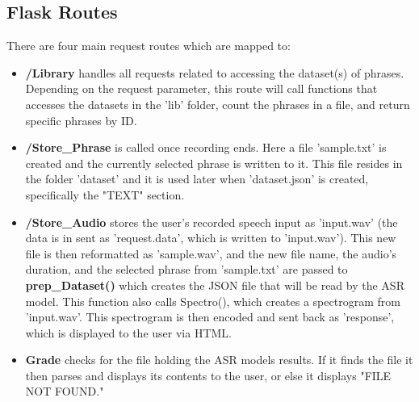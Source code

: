 \documentclass[12pt, letterpaper]{article}
\begin{document}
\subsection*{Flask Routes}
There are four main request routes which are mapped to:
\begin{itemize}
\item{\textbf{/Library}} handles all requests related to accessing the dataset(s) of phrases. Depending on the request parameter, this route will call functions that accesses the datasets in the 'lib' folder, count the phrases in a file, and return specific phrases by ID. 

\item{\textbf{/Store\_Phrase}} is called once recording ends. Here a file 'sample.txt' is created and the currently selected phrase is written to it. This file resides in the folder 'dataset' and it is used later when 'dataset.json' is created, specifically the "TEXT" section.

\item{\textbf{/Store\_Audio}} stores the user's recorded speech input as 'input.wav' (the data is in sent as 'request.data', which is written to 'input.wav'). This new file is then reformatted as 'sample.wav', and the new file name, the audio's duration, and the selected phrase from 'sample.txt' are passed to \textbf{prep\_Dataset()} which creates the JSON file that will be read by the ASR model.
This function also calls Spectro(), which creates a spectrogram from 'input.wav'. This spectrogram is then encoded and sent back as 'response', which is displayed to the user via HTML.

\item \textbf{Grade} checks for the file holding the ASR models results. If it finds the file it then parses and displays its contents to the user, or else it displays "FILE NOT FOUND."
\end{itemize}
\end{document}
